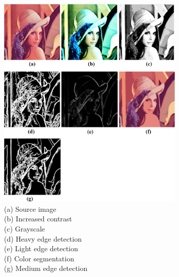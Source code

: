 \begin{figure}[p]
    \centering
    \includegraphics[width=0.8\textwidth]{diagrams/lena.png}
    \caption{(a) Source image\\(b) Increased contrast\\(c) Grayscale\\(d) Heavy edge detection\\(e) Light edge detection\\(f) Color segmentation\\(g) Medium edge detection}
    \label{fig:lena}
\end{figure}